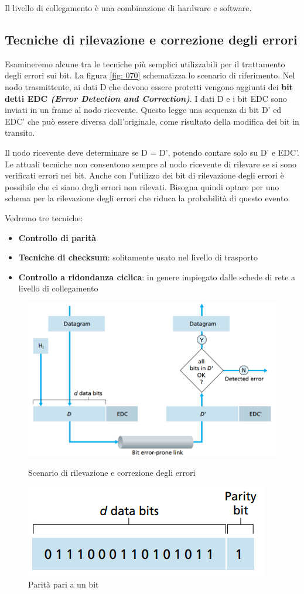 \documentclass[11pt,a4paper]{article}
\begin{document}
Il livello di collegamento è una combinazione di hardware e software.

\subsection{Tecniche di rilevazione e correzione degli errori}
Esamineremo alcune tra le tecniche più semplici utilizzabili per il trattamento degli errori sui bit.  La figura \ref{fig: 070} schematizza lo scenario di riferimento. Nel nodo trasmittente, ai dati D che devono essere protetti vengono aggiunti dei \textbf{bit detti EDC \textit{(Error Detection and Correction)}}. I dati D e i bit EDC sono inviati in un frame al nodo ricevente. Questo legge una sequenza di bit D' ed EDC' che può essere diversa dall'originale, come risultato della modifica dei bit in transito.

Il nodo ricevente deve determinare se D = D', potendo contare solo su D' e EDC'. Le attuali tecniche non consentono sempre al nodo ricevente di rilevare se si sono verificati errori nei bit. Anche con l'utilizzo dei bit di rilevazione degli errori è possibile che ci siano degli errori non rilevati. Bisogna quindi optare per uno schema per la rilevazione degli errori che riduca la probabilità di questo evento.

Vedremo tre tecniche:
\begin{itemize}
	\item \textbf{Controllo di parità}
	\item \textbf{Tecniche di checksum}: solitamente usato nel livello di trasporto
	\item \textbf{Controllo a ridondanza ciclica}: in genere impiegato dalle schede di rete a livello di collegamento
\end{itemize}
\begin{figure}
	\includegraphics[scale=0.6]{img/070.png}
	\caption{Scenario di rilevazione e correzione degli errori}
	\label{fig: 070}
	\includegraphics[scale=0.6]{img/071.png}
	\caption{Parità pari a un bit}
	\label{fig: 071}
\end{figure}
\end{document}
